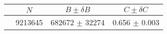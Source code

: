 \begin{tabular}{lccc}
\hline
    &   $N$   & $B \pm \delta B$  &  $C \pm \delta C$ \\
\hline
                               & 9213645    & 682672     $\pm$ 32274 & 0.656      $\pm$ 0.003 \\
\hline
\end{tabular}
